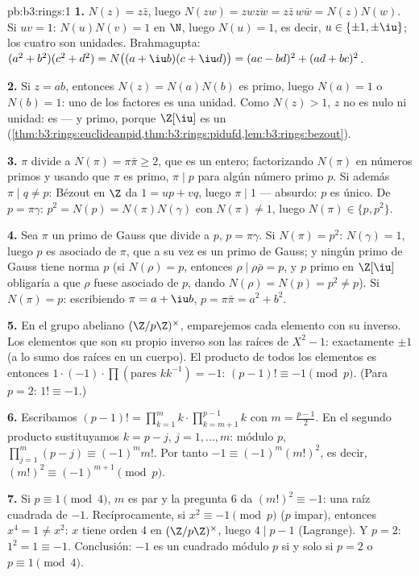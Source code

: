 \begin{solution}{pb:b3:rings:1}
\textbf{1.} $N(z) = z\bar z$, luego $N(zw) = zw\overline{zw} = z\bar
z\, w \bar w = N(z)N(w)$. Si $uv = 1$: $N(u)N(v) = 1$ en $\N$, luego
$N(u) = 1$, es decir, $u \in \{\pm 1, \pm \iu\}$; los cuatro son
unidades. Brahmagupta: $(a^2+b^2)(c^2+d^2) = N\bigl((a + \iu b)(c + \iu
d)\bigr) = (ac - bd)^2 + (ad + bc)^2$.

\textbf{2.} Si $z = ab$, entonces $N(z) = N(a)N(b)$ es primo, luego
$N(a) = 1$ o $N(b) = 1$: uno de los factores es una unidad. Como
$N(z) > 1$, $z$ no es nulo ni unidad: es
 --- y primo, porque
$\Z[\iu]$ es un 
(\cref{thm:b3:rings:euclideanpid,thm:b3:rings:pidufd,lem:b3:rings:bezout}).

\textbf{3.} $\pi$ divide a $N(\pi) = \pi\bar\pi \geq 2$, que es un
entero; factorizando $N(\pi)$ en números primos y usando que $\pi$ es
primo, $\pi \mid p$ para algún número primo $p$. Si además
$\pi \mid q \neq p$: Bézout en $\Z$ da $1 = up + vq$, luego $\pi \mid 1$
--- absurdo: $p$ es único. De $p = \pi\gamma$:
$p^2 = N(p) = N(\pi)N(\gamma)$ con $N(\pi) \neq 1$, luego $N(\pi)
\in \{p, p^2\}$.

\textbf{4.} Sea $\pi$ un primo de Gauss que divide a $p$, $p =
\pi\gamma$. Si $N(\pi) = p^2$: $N(\gamma) = 1$, luego $p$ es asociado de
$\pi$, que a su vez es un primo de Gauss; y ningún primo de Gauss tiene
norma $p$ (si $N(\rho) = p$, entonces $\rho \mid
\rho\bar\rho = p$, y $p$ primo en $\Z[\iu]$ obligaría a que $\rho$ fuese
asociado de $p$, dando $N(\rho) = N(p) = p^2 \neq
p$). Si $N(\pi) = p$: escribiendo $\pi = a + \iu b$,
$p = \pi\bar\pi = a^2
+ b^2$.

\textbf{5.} En el grupo abeliano $(\Z/p\Z)^\times$, emparejemos cada
elemento con su inverso. Los elementos que son su propio inverso son las
raíces de $X^2 - 1$: exactamente $\pm 1$ (a lo sumo dos raíces en un
cuerpo). El producto de todos los elementos es entonces
$1 \cdot (-1) \cdot \prod
(\text{pares } k k^{-1}) = -1$: $(p-1)! \equiv -1 \pmod p$. (Para
$p = 2$: $1! \equiv -1$.)

\textbf{6.} Escribamos $(p-1)! = \prod_{k=1}^m k \cdot
\prod_{k=m+1}^{p-1}k$ con $m = \frac{p-1}2$. En el segundo producto
sustituyamos $k = p - j$, $j = 1, \dots, m$: módulo $p$,
$\prod_{j=1}^m (p - j) \equiv (-1)^m m!$. Por tanto $-1 \equiv
(-1)^m (m!)^2$, es decir, $(m!)^2 \equiv (-1)^{m+1} \pmod p$.

\textbf{7.} Si $p \equiv 1 \pmod 4$, $m$ es par y la pregunta 6 da
$(m!)^2 \equiv -1$: una raíz cuadrada de $-1$. Recíprocamente, si
$x^2 \equiv -1 \pmod p$ ($p$ impar), entonces $x^4 = 1 \neq x^2$: $x$
tiene orden $4$ en $(\Z/p\Z)^\times$, luego $4 \mid p - 1$ (Lagrange). Y
$p = 2$: $1^2 = 1 \equiv -1$. Conclusión: $-1$ es un cuadrado módulo $p$
si y solo si $p = 2$ o $p \equiv 1 \pmod 4$.


\end{solution}

